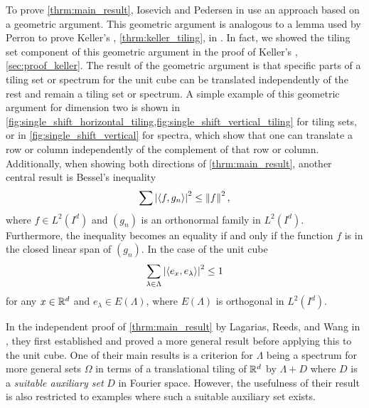 \documentclass[../thesis.tex]{subfiles}
\begin{document}
To prove \cref{thrm:main_result}, Iosevich and Pedersen in \cite{iosevichSpectralTilingProperties1998} use an approach based on a geometric argument. This geometric argument is analogous to a lemma used by Perron to prove Keller's , \cref{thrm:keller_tiling}, in \cite{perronUeberLueckenloseAusfuellung1940}. In fact, we showed the tiling set component of this geometric argument in the proof of Keller's , \cref{sec:proof_keller}. The result of the geometric argument is that specific parts of a tiling set or spectrum for the unit cube can be translated independently of the rest and remain a tiling set or spectrum. A simple example of this geometric argument for dimension two is shown in \cref{fig:single_shift_horizontal_tiling,fig:single_shift_vertical_tiling} for tiling sets, or in \cref{fig:single_shift_vertical} for spectra, which show that one can translate a row or column independently of the complement of that row or column. Additionally, when showing both directions of \cref{thrm:main_result}, another central result is Bessel's inequality
\begin{equation*}%
    \sum\bralMed{\braaMed{f,g_n}}^2 \leq \branMed{f}^2,
\end{equation*}
where $f\in L^2(I^d)$ and $(g_n)$ is an orthonormal family in $L^2(I^d)$. Furthermore, the inequality becomes an equality if and only if the function $f$ is in the closed linear span of $(g_n)$. In the case of the unit cube
\begin{equation*}
    \sum_{\lambda \in \Lambda} \left|\left \langle e_x,e_\lambda \right \rangle\right|^2 \leq 1
\end{equation*}
for any $x\in \mathbb{R}^d$ and $e_\lambda\in E(\Lambda)$, where $E(\Lambda)$ is orthogonal in $L^2(I^d)$.





In the independent proof of \cref{thrm:main_result} by Lagarias, Reeds, and Wang in \cite{lagariasOrthonormalBasesExponentials2000}, they first established and proved a more general result before applying this to the unit cube. One of their main results is a criterion for $\Lambda$ being a spectrum for more general sets $\Omega$ in terms of a translational tiling of $\mathbb{R}^d$ by $\Lambda+D$ where $D$ is a \emph{suitable auxiliary set} $D$ in Fourier space. However, the usefulness of their result is also restricted to examples where such a suitable auxiliary set exists. 
\end{document}
